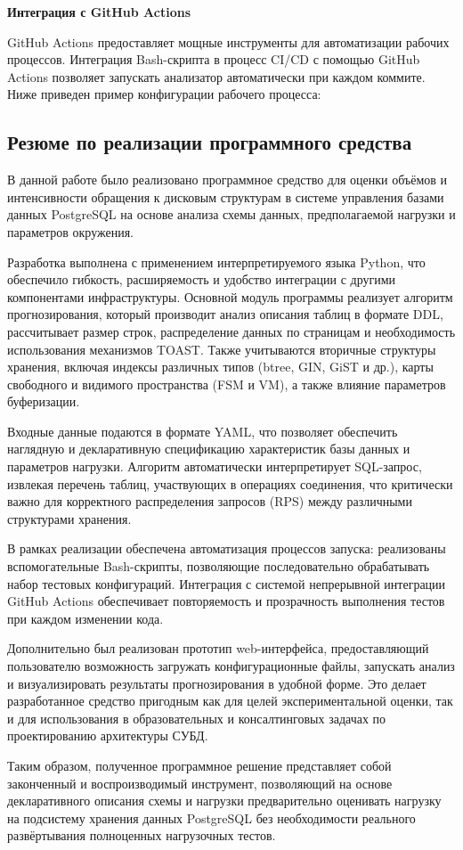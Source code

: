 \textbf{Интеграция с GitHub Actions}

GitHub Actions предоставляет мощные инструменты для автоматизации рабочих процессов. Интеграция Bash-скрипта в процесс CI/CD с помощью GitHub Actions позволяет запускать анализатор автоматически при каждом коммите. Ниже приведен пример конфигурации рабочего процесса:


\subsection{Резюме по реализации программного средства}

В данной работе было реализовано программное средство для оценки объёмов и интенсивности обращения к дисковым структурам в системе управления базами данных PostgreSQL на основе анализа схемы данных, предполагаемой нагрузки и параметров окружения.

Разработка выполнена с применением интерпретируемого языка Python, что обеспечило гибкость, расширяемость и удобство интеграции с другими компонентами инфраструктуры. 
Основной модуль программы реализует алгоритм прогнозирования, который производит анализ описания таблиц в формате DDL, рассчитывает размер строк, 
распределение данных по страницам и необходимость использования механизмов TOAST. Также учитываются вторичные структуры хранения, 
включая индексы различных типов (btree, GIN, GiST и др.), карты свободного и видимого пространства (FSM и VM), а также влияние параметров буферизации.

Входные данные подаются в формате YAML, что позволяет обеспечить наглядную и декларативную спецификацию характеристик базы данных и параметров нагрузки. Алгоритм автоматически интерпретирует SQL-запрос, извлекая перечень таблиц, участвующих в операциях соединения, что критически важно для корректного распределения запросов (RPS) между различными структурами хранения.

В рамках реализации обеспечена автоматизация процессов запуска: реализованы вспомогательные Bash-скрипты, позволяющие последовательно обрабатывать набор тестовых конфигураций. Интеграция с системой непрерывной интеграции GitHub Actions обеспечивает повторяемость и прозрачность выполнения тестов при каждом изменении кода.

Дополнительно был реализован прототип web-интерфейса, предоставляющий пользователю возможность загружать конфигурационные файлы, запускать анализ и визуализировать результаты прогнозирования в удобной форме. Это делает разработанное средство пригодным как для целей экспериментальной оценки, так и для использования в образовательных и консалтинговых задачах по проектированию архитектуры СУБД.

Таким образом, полученное программное решение представляет собой законченный и воспроизводимый инструмент, позволяющий на основе декларативного описания схемы и нагрузки предварительно оценивать нагрузку на подсистему хранения данных PostgreSQL без необходимости реального развёртывания полноценных нагрузочных тестов.

